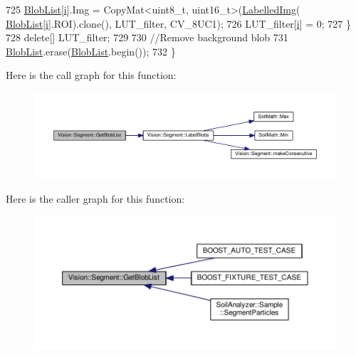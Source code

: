 \begin{DoxyCode}
725             \hyperlink{class_vision_1_1_segment_a74e0600a7dd49bd7110ee27bb4cd6e0e}{BlobList}[\hyperlink{_comparision_pictures_2_createtest_image_8m_a6f6ccfcf58b31cb6412107d9d5281426}{i}].Img = CopyMat<uint8\_t, uint16\_t>(\hyperlink{class_vision_1_1_segment_a4daa143f6cd4a753d3bbe45c6a67d27f}{LabelledImg}(
      \hyperlink{class_vision_1_1_segment_a74e0600a7dd49bd7110ee27bb4cd6e0e}{BlobList}[\hyperlink{_comparision_pictures_2_createtest_image_8m_a6f6ccfcf58b31cb6412107d9d5281426}{i}].ROI).clone(), LUT\_filter, CV\_8UC1);
726             LUT\_filter[\hyperlink{_comparision_pictures_2_createtest_image_8m_a6f6ccfcf58b31cb6412107d9d5281426}{i}] = 0;
727         \}
728         \textcolor{keyword}{delete}[] LUT\_filter;
729 
730         \textcolor{comment}{//Remove background blob}
731         \hyperlink{class_vision_1_1_segment_a74e0600a7dd49bd7110ee27bb4cd6e0e}{BlobList}.erase(\hyperlink{class_vision_1_1_segment_a74e0600a7dd49bd7110ee27bb4cd6e0e}{BlobList}.begin());
732     \}
\end{DoxyCode}


Here is the call graph for this function\+:\nopagebreak
\begin{figure}[H]
\begin{center}
\leavevmode
\includegraphics[width=350pt]{class_vision_1_1_segment_a6dba1b8506fe7e8054e99ea5330d4abc_cgraph}
\end{center}
\end{figure}




Here is the caller graph for this function\+:\nopagebreak
\begin{figure}[H]
\begin{center}
\leavevmode
\includegraphics[width=350pt]{class_vision_1_1_segment_a6dba1b8506fe7e8054e99ea5330d4abc_icgraph}
\end{center}
\end{figure}


